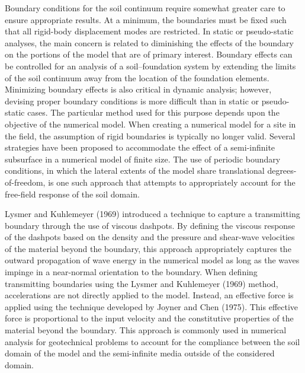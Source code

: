 Boundary conditions for the soil continuum require somewhat greater care to ensure appropriate results. At a minimum, the boundaries must be ﬁxed such that all rigid-body displacement modes are restricted. In static or pseudo-static analyses, the main concern is related to diminishing the eﬀects of the boundary on the portions of the model that are of primary interest. Boundary eﬀects can be controlled for an analysis of a soil–foundation system by extending the limits of the soil continuum away from the location of the foundation elements. Minimizing boundary eﬀects is also critical in dynamic analysis; however, devising proper boundary conditions is more diﬃcult than in static or pseudo-static cases. The particular method used for this purpose depends upon the objective of the numerical model. When creating a numerical model for a site in the ﬁeld, the assumption of rigid boundaries is typically no longer valid. Several strategies have been proposed to accommodate the eﬀect of a semi-inﬁnite subsurface in a numerical model of ﬁnite size. The use of periodic boundary conditions, in which the lateral extents of the model share translational degrees-of-freedom, is one such approach that attempts to appropriately account for the free-ﬁeld response of the soil domain. 

Lysmer and Kuhlemeyer (1969) introduced a technique to capture a transmitting boundary through the use of viscous dashpots. By deﬁning the viscous response of the dashpots based on the density and the pressure and shear-wave velocities of the material beyond the boundary, this approach appropriately captures the outward propagation of wave energy in the numerical model as long as the waves impinge in a near-normal orientation to the boundary. When deﬁning transmitting boundaries using the Lysmer and Kuhlemeyer (1969) method, accelerations are not directly applied to the model. Instead, an effective force is applied using the technique developed by Joyner and Chen (1975). This effective force is proportional to the input velocity and the constitutive properties of the material beyond the boundary. This approach is commonly used in numerical analysis for geotechnical problems to account for the compliance between the soil domain of the model and the semi-inﬁnite media outside of the considered domain.

